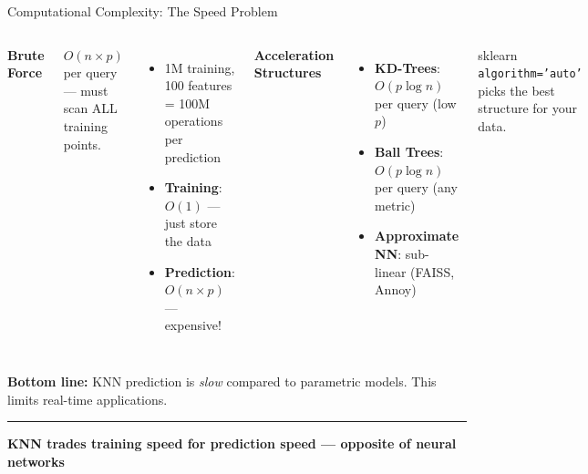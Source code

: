 \documentclass[8pt,aspectratio=169]{beamer}
\newcommand{\bottomnote}[1]{%
\vfill
\vspace{-2mm}
\textcolor{mllavender2}{\rule{\textwidth}{0.4pt}}
\vspace{1mm}
\footnotesize
\textbf{#1}
}
\newenvironment{compactlist}{%
  \begin{itemize}%
    \setlength{\itemsep}{2pt}%
    \setlength{\parskip}{0pt}%
    \setlength{\parsep}{0pt}%
}{%
  \end{itemize}%
}
\newcommand{\highlight}[1]{\textcolor{mlorange}{\textbf{#1}}}
\begin{document}
\begin{frame}[t]{Computational Complexity: The Speed Problem}
\begin{columns}[T]
\small
\textbf{Brute Force}

\footnotesize
$O(n \times p)$ per query --- must scan ALL training points.
\begin{compactlist}
\item \footnotesize 1M training, 100 features = 100M operations per prediction
\item \footnotesize \highlight{Training}: $O(1)$ --- just store the data
\item \footnotesize \highlight{Prediction}: $O(n \times p)$ --- expensive!
\end{compactlist}

\small
\textbf{Acceleration Structures}

\footnotesize
\begin{compactlist}
\item \footnotesize \textbf{KD-Trees}: $O(p \log n)$ per query (low $p$)
\item \footnotesize \textbf{Ball Trees}: $O(p \log n)$ per query (any metric)
\item \footnotesize \textbf{Approximate NN}: sub-linear (FAISS, Annoy)
\end{compactlist}

\vspace{2mm}
\begin{block}{sklearn}
\footnotesize \texttt{algorithm='auto'} picks the best structure for your data.
\end{block}
\end{columns}

\vspace{3mm}
\footnotesize
\highlight{Bottom line:} KNN prediction is \emph{slow} compared to parametric models. This limits real-time applications.
\bottomnote{KNN trades training speed for prediction speed --- opposite of neural networks}
\end{frame}

\end{document}
